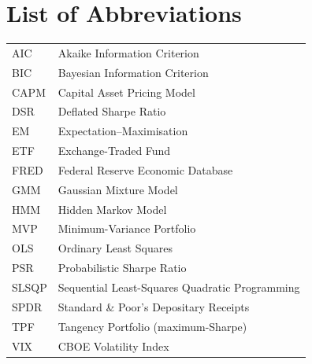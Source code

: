 \documentclass[12pt,a4paper]{article}
\begin{document}
\section*{List of Abbreviations}
\begin{tabular}{ll}
AIC   & Akaike Information Criterion \\
BIC   & Bayesian Information Criterion \\
CAPM  & Capital Asset Pricing Model \\
DSR   & Deflated Sharpe Ratio \\
EM    & Expectation--Maximisation \\
ETF   & Exchange-Traded Fund \\
FRED  & Federal Reserve Economic Database \\
GMM   & Gaussian Mixture Model \\
HMM   & Hidden Markov Model \\
MVP   & Minimum-Variance Portfolio \\
OLS   & Ordinary Least Squares \\
PSR   & Probabilistic Sharpe Ratio \\
SLSQP & Sequential Least-Squares Quadratic Programming \\
SPDR  & Standard \& Poor's Depositary Receipts \\
TPF   & Tangency Portfolio (maximum-Sharpe) \\
VIX   & CBOE Volatility Index \\
\end{tabular}
\clearpage

\end{document}
